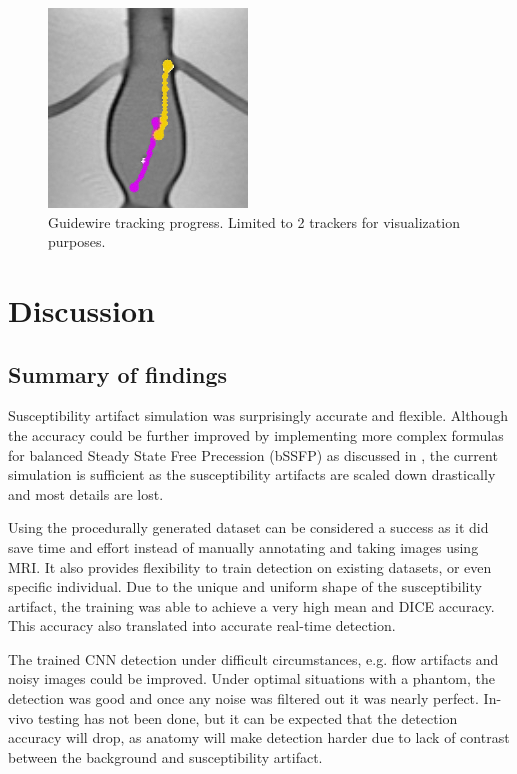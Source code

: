 \documentclass[conference]{IEEEtran}
\begin{document}
\begin{figure}[htbp]
\begin{minipage}[t]{0.49\textwidth}
        \vspace{0.1cm}      \includegraphics[width=0.49\linewidth]{Conference/img/tracking-websocket-tracks-end.jpg}
    \end{minipage}
    \caption{Guidewire tracking progress. Limited to 2 trackers for visualization purposes.}
    \label{fig:tracking-algorithm}
\end{figure}


\section{Discussion}

\subsection{Summary of findings}
Susceptibility artifact simulation was surprisingly accurate and flexible. Although the accuracy could be further improved by implementing more complex formulas for balanced Steady State Free Precession (bSSFP) as discussed in \cite{sunil-patil-phd}, the current simulation is sufficient as the susceptibility artifacts are scaled down drastically and most details are lost.

Using the procedurally generated dataset can be considered a success as it did save time and effort instead of manually annotating and taking images using MRI. It also provides flexibility to train detection on existing datasets, or even specific individual. Due to the unique and uniform shape of the susceptibility artifact, the training was able to achieve a very high mean and DICE accuracy. This accuracy also translated into accurate real-time detection. 

The trained CNN detection under difficult circumstances, e.g. flow artifacts and noisy images could be improved. Under optimal situations with a phantom, the detection was good and once any noise was filtered out it was nearly perfect. 
In-vivo testing has not been done, but it can be expected that the detection accuracy will drop, as anatomy will make detection harder due to lack of contrast between the background and susceptibility artifact.
\end{document}
